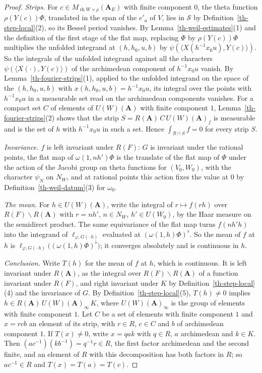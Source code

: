 \begin{proof}
\emph{Strips.} For $c\in M_{\operatorname{rk}W\times\rho}(\mathbf A_E)$ with
finite component $0$, the theta function $\rho(Y(c))\Phi$, translated in the
span of the $e'_a$ of $V$, lies in $\mathcal S$ by
Definition~\ref{th-step-local}(2), so its Bessel period vanishes. By
Lemma~\ref{th-weil-estimates}(1) and the definition of the first stage of the
flat map, replacing $\Phi$ by $\rho(Y(c))\Phi$ multiplies the unfolded
integrand at $(h,h_0,u,b)$ by
$\psi(\langle X(h^{-1}x_0u),Y(c)\rangle)$. So the integrals of the unfolded
integrand against all the characters $\psi(\langle X(\cdot),Y(c)\rangle)$ of
the archimedean component of $h^{-1}x_0u$ vanish. By
Lemma~\ref{th-fourier-strips}(1), applied to the unfolded integrand on the
space of the $(h,h_0,u,b)$ with $x(h,h_0,u,b)=h^{-1}x_0u$, its integral over the
points with $h^{-1}x_0u$ in a measurable set read on the archimedean components
vanishes. For a compact set $C$ of elements of $U(W)(\mathbf A)$ with finite
component $1$, Lemma~\ref{th-fourier-strips}(2) shows that the strip
$S=R(\mathbf A)\,C\,U(W)(\mathbf A)_f$ is measurable and is the set of $h$ with
$h^{-1}x_0u$ in such a set. Hence $\int_{\mathcal B\cap S}f=0$ for every strip
$S$.

\emph{Invariance.} $f$ is left invariant under $R(F)$: $G$ is invariant under
the rational points, the flat map of $\omega(1,nh')\Phi$ is the translate of the
flat map of $\Phi$ under the action of the Jacobi group on theta functions for
$(V_0,W_0)$, with the character $\psi_N$ on $N_W$, and at rational points this
action fixes the value at $0$ by Definition~\ref{th-weil-datum}(3) for
$\omega_0$.

\emph{The mean.} For $h\in U(W)(\mathbf A)$, write the integral of
$r\mapsto f(rh)$ over $R(F)\backslash R(\mathbf A)$ with $r=nh'$, $n\in N_W$,
$h'\in U(W_0)$, by the Haar measure on the semidirect product. The same
equivariance of the flat map turns $f(nh'h)$ into the integrand of
$\ell_{\varphi,G(\cdot\,h)}$ evaluated at $(\omega(1,h)\Phi)^\flat$. So the mean
of $f$ at $h$ is $\ell_{\varphi,G(\cdot\,h)}\bigl((\omega(1,h)\Phi)^\flat\bigr)$;
it converges absolutely and is continuous in $h$.

\emph{Conclusion.} Write $T(h)$ for the mean of $f$ at $h$, which is
continuous. It is left invariant under $R(\mathbf A)$, as the integral over
$R(F)\backslash R(\mathbf A)$ of a function invariant under $R(F)$, and right
invariant under $K$ by Definition~\ref{th-step-local}(4) and the invariance of
$G$. By Definition~\ref{th-step-local}(5), $T(h)\neq0$ implies
$h\in R(\mathbf A)\,U(W)(\mathbf A)_\infty\,K$, where $U(W)(\mathbf A)_\infty$ is
the group of elements with finite component $1$. Let $C$ be a set of elements
with finite component $1$ and $x=rcb$ an element of its strip, with $r\in R$,
$c\in C$ and $b$ of archimedean component $1$. If $T(x)\neq0$, write $x=qak$
with $q\in R$, $a$ archimedean and $k\in K$. Then
$(ac^{-1})(kb^{-1})=q^{-1}r\in R$, the first factor archimedean and the second
finite, and an element of $R$ with this decomposition has both factors in $R$;
so $ac^{-1}\in R$ and $T(x)=T(a)=T(c)$.


\end{proof}
